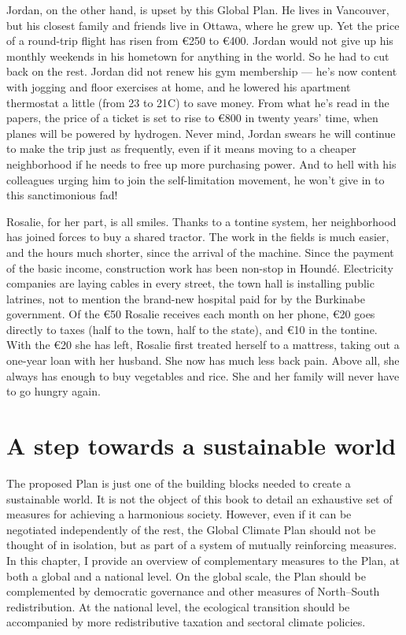 \documentclass[a5paper,english,openany]{memoir}
\begin{document}
Jordan, on the other hand, is upset by this Global Plan. He lives in Vancouver, but his closest family and friends live in Ottawa, where he grew up. Yet the price of a round-trip flight has risen from \euro{}250 to \euro{}400. Jordan would not give up his monthly weekends in his hometown for anything in the world. So he had to cut back on the rest. Jordan did not renew his gym membership --- he's now content with jogging and floor exercises at home, and he lowered his apartment thermostat a little (from 23 to 21\textdegree{}C) to save money. From what he's read in the papers, the price of a ticket is set to rise to \euro{}800 in twenty years' time, when planes will be powered by hydrogen. Never mind, Jordan swears he will continue to make the trip just as frequently, even if it means moving to a cheaper neighborhood if he needs to free up more purchasing power. And to hell with his colleagues urging him to join the self-limitation movement, he won't give in to this sanctimonious fad!

Rosalie, for her part, is all smiles. Thanks to a tontine system, her neighborhood has joined forces to buy a shared tractor. The work in the fields is much easier, and the hours much shorter, since the arrival of the machine. Since the payment of the basic income, construction work has been non-stop in Houndé. Electricity companies are laying cables in every street, the town hall is installing public latrines, not to mention the brand-new hospital paid for by the Burkinabe government. Of the \euro{}50 Rosalie receives each month on her phone, \euro{}20 goes directly to taxes (half to the town, half to the state), and \euro{}10 %
in the tontine. With the \euro{}20 she has left, Rosalie first treated herself to a mattress, taking out a one-year loan with her husband. She now has much less back pain. Above all, she always has enough to buy vegetables and rice. She and her family will never have to go hungry again.


\chapter{A step towards a sustainable world}\label{ch:premier_pas} %

The proposed Plan %
is just one of the building blocks needed to create a sustainable world. It is not the object of this book %
to detail an exhaustive set of measures for achieving a harmonious society. However, even if it can be negotiated independently of the rest, the Global Climate Plan should not be thought of in isolation, but as part of a system of mutually reinforcing measures. In this chapter, I %
provide an overview of complementary measures to the %
Plan, at both %
a global and %
a national level. On the %
global scale, the Plan should be complemented by democratic governance and other measures of North--South redistribution. At the %
national level, the ecological transition %
should be accompanied by more redistributive taxation and sectoral climate policies. 
\end{document}
